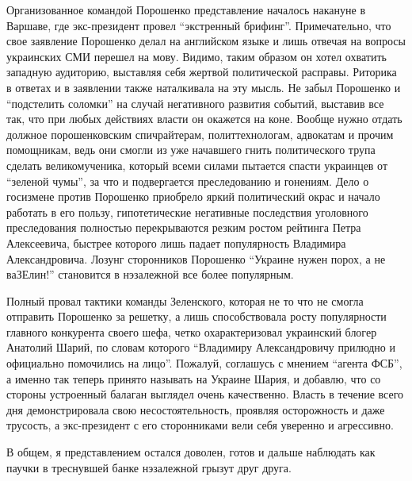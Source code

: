 Организованное командой Порошенко представление началось накануне в Варшаве,
где экс-президент провел \enquote{экстренный брифинг}. Примечательно, что свое
заявление Порошенко делал на английском языке и лишь отвечая на вопросы
украинских СМИ перешел на мову. Видимо, таким образом он хотел охватить
западную аудиторию, выставляя себя жертвой политической расправы. Риторика в
ответах и в заявлении также наталкивала на эту мысль. Не забыл Порошенко и
\enquote{подстелить соломки} на случай негативного развития событий, выставив все так,
что при любых действиях власти он окажется на коне. Вообще нужно отдать должное
порошенковским спичрайтерам, политтехнологам, адвокатам и прочим помощникам,
ведь они смогли из уже начавшего гнить политического трупа сделать
великомученика, который всеми силами пытается спасти украинцев от \enquote{зеленой
чумы}, за что и подвергается преследованию и гонениям. Дело о госизмене против
Порошенко приобрело яркий политический окрас и начало работать в его пользу,
гипотетические негативные последствия уголовного преследования полностью
перекрываются резким ростом рейтинга Петра Алексеевича, быстрее которого лишь
падает популярность Владимира Александровича. Лозунг сторонников Порошенко
\enquote{Украине нужен порох, а не ваЗЕлин!} становится в нэзалежной все более
популярным.

Полный провал тактики команды Зеленского, которая не то что не смогла отправить
Порошенко за решетку, а лишь способствовала росту популярности главного
конкурента своего шефа, четко охарактеризовал украинский блогер Анатолий Шарий,
по словам которого \enquote{Владимиру Александровичу прилюдно и официально помочились
на лицо}. Пожалуй, соглашусь с мнением \enquote{агента ФСБ}, а именно так теперь
принято называть на Украине Шария, и добавлю, что со стороны устроенный балаган
выглядел очень качественно. Власть в течение всего дня демонстрировала свою
несостоятельность, проявляя осторожность и даже трусость, а экс-президент с его
сторонниками вели себя уверенно и агрессивно.

В общем, я представлением остался доволен, готов и дальше наблюдать как паучки
в треснувшей банке нэзалежной грызут друг друга.
